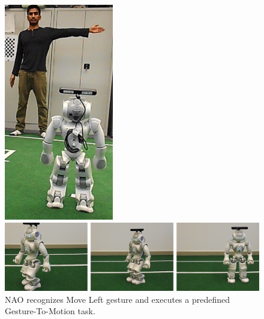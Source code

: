 \begin{figure}
	[h] 
	\begin{minipage}
		{1 
		\textwidth} \centering 
		\includegraphics[height=95mm]{figures/result/usr-move-left.jpg} \caption*{} 
	\end{minipage}
	\begin{minipage}
		{1 
		\textwidth} \hspace{-5 mm} 
		\includegraphics[width=160mm]{figures/result/nao-gm-move-left.jpg} 
	\end{minipage}
	\caption{NAO recognizes Move Left gesture and executes a predefined Gesture-To-Motion task.} \label{res:gm:move:left} 
\end{figure}
